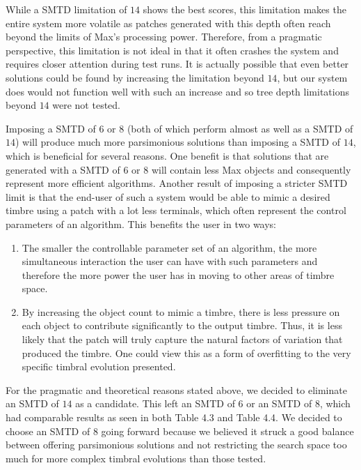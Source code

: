 \documentclass[a4paper,12pt]{report} 	%
\numberwithin{figure}{chapter}
\numberwithin{table}{chapter}
\numberwithin{equation}{chapter}
\begin{document}
\begin{flushleft}
While a SMTD limitation of $14$ shows the best scores, this limitation makes the entire system more volatile as patches generated with this depth often reach beyond the limits of Max's processing power. Therefore, from a pragmatic perspective, this limitation is not ideal in that it often crashes the system and requires closer attention during test runs. It is actually possible that even better solutions could be found by increasing the limitation beyond $14$, but our system does would not function well with such an increase and so tree depth limitations beyond $14$ were not tested.

Imposing a SMTD of $6$ or $8$ (both of which perform almost as well as a SMTD of $14$) will produce much more parsimonious solutions than imposing a SMTD of $14$, which is beneficial for several reasons. One benefit is that solutions that are generated with a SMTD of $6$ or $8$ will contain less Max objects and consequently represent more efficient algorithms. Another result of imposing a stricter SMTD limit is that the end-user of such a system would be able to mimic a desired timbre using a patch with a lot less terminals, which often represent the control parameters of an algorithm. This benefits the user in two ways:
\begin{enumerate}
\item The smaller the controllable parameter set of an algorithm, the more simultaneous interaction the user can have with such parameters and therefore the more power the user has in moving to other areas of timbre space.
\item By increasing the object count to mimic a timbre, there is less pressure on each object to contribute significantly to the output timbre. Thus, it is less likely that the patch will truly capture the natural factors of variation that produced the timbre. One could view this as a form of overfitting to the very specific timbral evolution presented.
\end{enumerate}
For the pragmatic and theoretical reasons stated above, we decided to eliminate an SMTD of $14$ as a candidate. This left an SMTD of $6$ or an SMTD of $8$, which had comparable results as seen in both Table 4.3 and Table 4.4. We decided to choose an SMTD of $8$ going forward because we believed it struck a good balance between offering parsimonious solutions and not restricting the search space too much for more complex timbral evolutions than those tested.


\end{flushleft}
\end{document}
